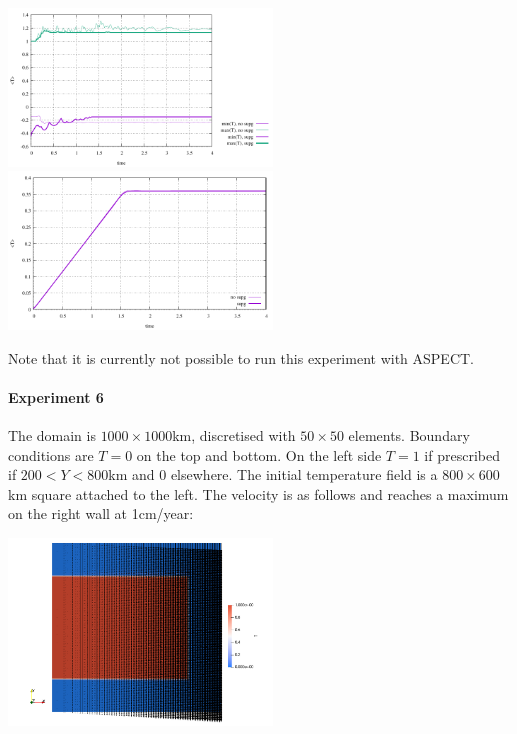 \begin{center}
\includegraphics[width=7cm]{python_codes/fieldstone_43/results/experiment5/stats_T}
\includegraphics[width=7cm]{python_codes/fieldstone_43/results/experiment5/avrg_T}
\end{center}

Note that it is currently not possible to run this experiment with ASPECT.

\paragraph{Experiment 6}

The domain is $1000\times1000$km, discretised with $50\times50$ elements. Boundary conditions are
$T=0$ on the top and bottom. On the left side $T=1$ if prescribed if $200<Y<800$km and 0 elsewhere.
The initial temperature field is a $800\times600$km square attached to the left.
The velocity is as follows and reaches a maximum on the right wall at 1cm/year:

\begin{center}
\includegraphics[width=7cm]{python_codes/fieldstone_43/results/experiment6/setup}
\end{center}

